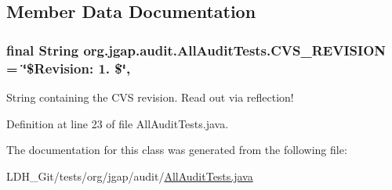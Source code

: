 \subsection{Member Data Documentation}
\hypertarget{classorg_1_1jgap_1_1audit_1_1_all_audit_tests_abe8ff0abc5c0e05a3213026eb5ba7ad7}{
\subsubsection[{C\-V\-S\-\_\-\-R\-E\-V\-I\-S\-I\-O\-N}]{\setlength{\rightskip}{0pt plus 5cm}final String org.\-jgap.\-audit.\-All\-Audit\-Tests.\-C\-V\-S\-\_\-\-R\-E\-V\-I\-S\-I\-O\-N = \char`\"{}\$Revision\-: 1. \$\char`\"{}\hspace{0.3cm}{\ttfamily [static]}, {\ttfamily [private]}}}\label{classorg_1_1jgap_1_1audit_1_1_all_audit_tests_abe8ff0abc5c0e05a3213026eb5ba7ad7}
String containing the C\-V\-S revision. Read out via reflection! 

Definition at line 23 of file All\-Audit\-Tests.\-java.



The documentation for this class was generated from the following file\-:\begin{DoxyCompactItemize}
\item 
L\-D\-H\-\_\-\-Git/tests/org/jgap/audit/\hyperlink{_all_audit_tests_8java}{All\-Audit\-Tests.\-java}\end{DoxyCompactItemize}
